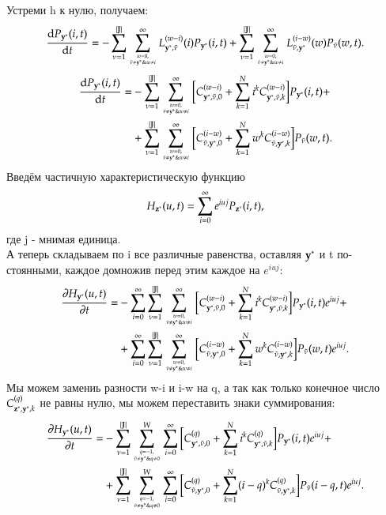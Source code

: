 Устреми h к нулю, получаем:
\[
	\dv{P_{\bold{y}^*}(i, t)}{t} = 
	- \sum_{\nu = 1}^{|\mathbb{J}|}\sum_{w=0,\atop \tilde{\nu} \neq \bold{y}^*\& w\neq i}^{\infty}L^{(w-i)}_{\bold{y}^*, \tilde{\nu}}(i)P_{\bold{y}^*}(i, t)+
	\sum_{\nu = 1}^{|\mathbb{J}|}\sum_{w=0,\atop \tilde{\nu} \neq \bold{y}^*\& w\neq i}^{\infty}
	L^{(i-w)}_{\tilde{\nu}, \bold{y}^*}(w)P_{\tilde{\nu}}(w, t).
\]
\begin{align*}
	\dv{P_{\bold{y}^*}(i, t)}{t} = &
	- \sum_{\nu = 1}^{|\mathbb{J}|}\sum_{w=0,\atop \tilde{\nu} \neq \bold{y}^*\& w\neq i}^{\infty}
	\bigg[ C^{(w-i)}_{\bold{y}^*, \tilde{\nu}, 0}+\sum^{N}_{k=1}i^kC^{(w-i)}_{\bold{y}^*, \tilde{\nu}, k} \bigg]P_{\bold{y}^*}(i, t)+ \\
	&+\sum_{\nu = 1}^{|\mathbb{J}|}\sum_{w=0,\atop \tilde{\nu} \neq \bold{y}^*\& w\neq i}^{\infty}
	\bigg[ C^{(i-w)}_{\tilde{\nu},\bold{y}^*, 0}+\sum^{N}_{k=1}w^kC^{(i-w)}_{\tilde{\nu},\bold{y}^*, k} \bigg]P_{\tilde{\nu}}(w, t).
\end{align*}
Введём частичную характеристическую функцию \[H_{\bold{z}^*}(u,t)=\sum_{i=0}^\infty e^{iuj}P_{\bold{z}^*}(i, t),\] 
где j - мнимая единица.\\
А теперь складываем по i все различные равенства, оставляя \(\bold{y}^*\) и t по-
стоянными, каждое домножив перед этим каждое на \(e^{iuj}\):
\begin{align*}
	\pdv{H_{\bold{y}^*}(u, t)}{t} = &-\sum_{i = 0}^{\infty} 
	\sum_{\nu = 1}^{|\mathbb{J}|}\sum_{w=0,\atop \tilde{\nu} \neq \bold{y}^*\& w\neq i}^{\infty}
	\bigg[ C^{(w-i)}_{\bold{y}^*, \tilde{\nu}, 0}+\sum^{N}_{k=1}i^kC^{(w-i)}_{\bold{y}^*, \tilde{\nu}, k} \bigg]P_{\bold{y}^*}(i, t)e^{iuj}+ \\
	&+\sum_{i = 0}^{\infty} \sum_{\nu = 1}^{|\mathbb{J}|}\sum_{w=0,\atop \tilde{\nu} \neq \bold{y}^*\& w\neq i}^{\infty}
	\bigg[ C^{(i-w)}_{\tilde{\nu}, \bold{y}^*, 0}+\sum^{N}_{k=1}w^kC^{(i-w)}_{\tilde{\nu}, \bold{y}^*, k} \bigg]P_{\tilde{\nu}}(w, t)e^{iuj}.
\end{align*}
Мы можем замениь разности w-i и i-w на q, а так как только конечное число \(C^{(q)}_{\bold{z}^*,\bold{y}^*, k}\) не равны нулю, мы можем переставить знаки суммирования:
\begin{align*}
	\pdv{H_{\bold{y}^*}(u, t)}{t} = &-
	\sum_{\nu = 1}^{|\mathbb{J}|}\sum_{q = -1, \atop \tilde{\nu} \neq \bold{y}^*\& q\neq 0}^{W}\sum_{i = 0}^{\infty} 
	\bigg[ C^{(q)}_{\bold{y}^*, \tilde{\nu}, 0}+\sum^{N}_{k=1}i^kC^{(q)}_{\bold{y}^*, \tilde{\nu}, k} \bigg]P_{\bold{y}^*}(i, t)e^{iuj}+ \\
	&+\sum_{\nu = 1}^{|\mathbb{J}|}\sum_{q = -1, \atop \tilde{\nu} \neq \bold{y}^*\& q\neq 0}^{W}\sum_{i = 0}^{\infty} 
	\bigg[ C^{(q)}_{\tilde{\nu}, \bold{y}^*, 0}+\sum^{N}_{k=1}(i-q)^kC^{(q)}_{\tilde{\nu}, \bold{y}^*, k} \bigg]P_{\tilde{\nu}}(i-q, t)e^{iuj}.
\end{align*}
